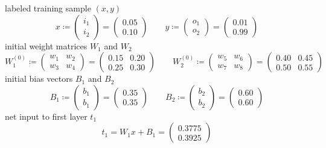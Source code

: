 \documentclass[a4paper,fleqn]{article}
\begin{document}
  \noindent
  labeled training sample $(x,y)$
  \[
    x \coloneqq
    \begin{pmatrix}
      i_1 \\ i_2
    \end{pmatrix}
    =
    \begin{pmatrix}
      0.05 \\ 0.10
    \end{pmatrix}
    \qquad
    y \coloneqq
    \begin{pmatrix}
      o_1 \\ o_2
    \end{pmatrix}
    =
    \begin{pmatrix}
      0.01 \\ 0.99
    \end{pmatrix}
  \]
  initial weight matrices $W_1$ and $W_2$
  \[
    W^{(0)}_1 \coloneqq
    \begin{pmatrix}
      w_1 & w_2 \\
      w_3 & w_4
    \end{pmatrix}
    =
    \begin{pmatrix}
      0.15 & 0.20 \\
      0.25 & 0.30
    \end{pmatrix}
    \qquad
    W^{(0)}_2 \coloneqq
    \begin{pmatrix}
      w_5 & w_6 \\
      w_7 & w_8
    \end{pmatrix}
    =
    \begin{pmatrix}
      0.40 & 0.45 \\
      0.50 & 0.55
    \end{pmatrix}
  \]
  initial bias vectors $B_1$ and $B_2$
  \[
    B_1 \coloneqq
    \begin{pmatrix}
      b_1 \\ b_1
    \end{pmatrix}
    =
    \begin{pmatrix}
      0.35 \\ 0.35
    \end{pmatrix}
    \qquad
    B_2 \coloneqq
    \begin{pmatrix}
      b_2 \\ b_2
    \end{pmatrix}
    =
    \begin{pmatrix}
      0.60 \\ 0.60
    \end{pmatrix}
  \]
  net input to first layer $t_1$
  \[
    t_1 = W_1 x + B_1 =
    \begin{pmatrix}
      0.3775 \\ 0.3925
    \end{pmatrix}
  \]
\end{document}

